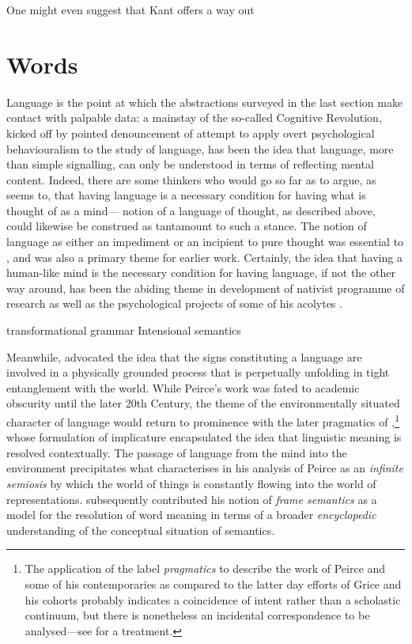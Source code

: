 One might even suggest that Kant offers a way out 

\section{Words}
Language is the point at which the abstractions surveyed in the last section make contact with palpable data: a mainstay of the so-called Cognitive Revolution, kicked off by  pointed denouncement of  attempt to apply overt psychological behaviouralism to the study of language, has been the idea that language, more than simple signalling, can only be understood in terms of reflecting mental content.  Indeed, there are some thinkers who would go so far as to argue, as \cite{Dennett1996} seems to, that having language is a necessary condition for having what is thought of as a mind--- notion of a language of thought, as described above, could likewise be construed as tantamount to such a stance.  The notion of language as either an impediment or an incipient to pure thought was essential to \cite{Russell1905,Russell1931}, and was also a primary theme for  earlier work.  Certainly, the idea that having a human-like mind is the necessary condition for having language, if not the other way around, has been the abiding theme in development of  nativist programme of research as well as the psychological projects of some of his acolytes \citep{Pinker1994}.

transformational grammar
Intensional semantics

Meanwhile, \cite{Peirce1931} advocated the idea that the signs constituting a language are involved in a physically grounded process that is perpetually unfolding in tight entanglement with the world.  While Peirce's work was fated to academic obscurity until the later 20th Century, the theme of the environmentally situated character of language would return to prominence with the later pragmatics of \cite{Grice1975},\footnote{The application of the label \emph{pragmatics} to describe the work of Peirce and some of his contemporaries as compared to the latter day efforts of Grice and his cohorts probably indicates a coincidence of intent rather than a scholastic continuum, but there is nonetheless an incidental correspondence to be analysed---see \cite{Pietarinen2004} for a treatment.} whose formulation of implicature encapsulated the idea that linguistic meaning is resolved contextually.  The passage of language from the mind into the environment precipitates what \cite{Eco1976} characterises in his analysis of Peirce as an \emph{infinite semiosis} by which the world of things is constantly flowing into the world of representations.   subsequently contributed his notion of \emph{frame semantics} as a model for the resolution of word meaning in terms of a broader \emph{encyclopedic} understanding of the conceptual situation of semantics.

